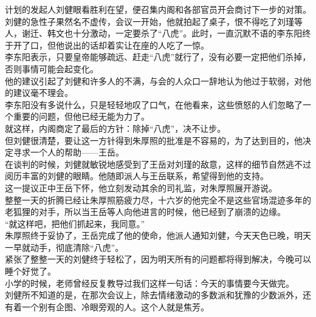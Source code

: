 \begin{multicols}{\theparacolNo}
计划的发起人刘健眼看胜利在望，便召集内阁和各部官员开会商讨下一步的对策。\\

刘健的急性子果然名不虚传，会议一开始，他就拍起了桌子，恨不得吃了刘瑾等人，谢迁、韩文也十分激动，一定要杀了“八虎”。此时，一直沉默不语的李东阳终于开了口，但他说出的话却着实让在座的人吃了一惊。\\

李东阳表示，只要皇帝能够疏远、赶走“八虎”就行了，没有必要一定把他们杀掉，否则事情可能会起变化。\\

他的建议引起了刘健和许多人的不满，与会的人众口一辞地认为他过于软弱，对他的建议毫不理会。\\

李东阳没有多说什么，只是轻轻地叹了口气，在他看来，这些愤怒的人们忽略了一个重要的问题，但他已经无能为力了。\\

就这样，内阁商定了最后的方针：除掉“八虎”，决不让步。\\

但刘健很清楚，要让这一方针得到朱厚照的批准是不容易的，为了达到目的，他决定寻求一个人的帮助——王岳。\\

在谈判的时候，刘健就敏锐地感受到了王岳对刘瑾的敌意，这样的细节自然逃不过阅历丰富的刘健的眼睛。他随即派人与王岳联系，希望得到他的支持。\\

这一提议正中王岳下怀，他立刻发动其余的司礼监，对朱厚照展开游说。\\

整整一天的折腾已经让朱厚照筋疲力尽，十六岁的他完全不是这些官场混迹多年的老狐狸的对手，所以当王岳等人向他进言的时候，他已经到了崩溃的边缘。\\

“就这样吧，把他们抓起来，我同意。”\\

朱厚照终于妥协了，王岳完成了他的使命，他派人通知刘健，今天天色已晚，明天一早就动手，彻底清除“八虎”。\\

紧张了整整一天的刘健终于轻松了，因为明天所有的问题都将得到解决，今晚可以睡个好觉了。\\

小学的时候，老师曾经反复教导过我们这样一句话：今天的事情要今天做完。\\

刘健所不知道的是，在那次会议上，除去情绪激动的多数派和犹豫的少数派外，还有着一个别有企图、冷眼旁观的人。这个人就是焦芳。\\


\end{multicols}
